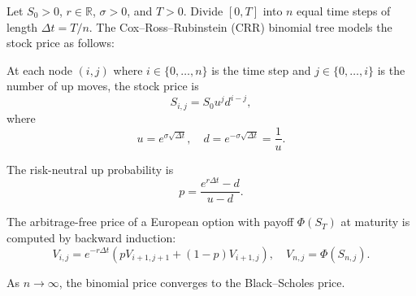 \begin{definition} \label{definition:binomial_option_pricing_tree_cox_ross_rubinstein}
Let $S_0 > 0$, $r \in \mathbb{R}$, $\sigma > 0$, and $T > 0$. Divide $[0, T]$ into $n$ equal time steps of length $\Delta t = T/n$. The Cox--Ross--Rubinstein (CRR) binomial tree models the stock price as follows:

At each node $(i, j)$ where $i \in \{0, \dots, n\}$ is the time step and $j \in \{0, \dots, i\}$ is the number of up moves, the stock price is
$$S_{i,j} = S_0 u^j d^{i-j},$$
where
$$u = e^{\sigma\sqrt{\Delta t}}, \quad d = e^{-\sigma\sqrt{\Delta t}} = \frac{1}{u}.$$

The risk-neutral up probability is
$$p = \frac{e^{r\Delta t} - d}{u - d}.$$

The arbitrage-free price of a European option with payoff $\Phi(S_T)$ at maturity is computed by backward induction:
$$V_{i,j} = e^{-r\Delta t}\left(p V_{i+1, j+1} + (1-p) V_{i+1, j}\right), \quad V_{n,j} = \Phi(S_{n,j}).$$

As $n \to \infty$, the binomial price converges to the Black--Scholes price.
\end{definition}